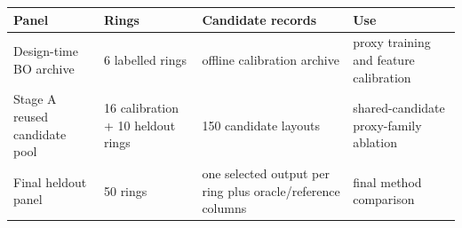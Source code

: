 \begin{tabular}{p{}p{}p{}p{}}
\toprule
Panel & Rings & Candidate records & Use \\
\midrule
Design-time BO archive & 6 labelled rings & offline calibration archive & proxy training and feature calibration \\
Stage A reused candidate pool & 16 calibration + 10 heldout rings & 150 candidate layouts & shared-candidate proxy-family ablation \\
Final heldout panel & 50 rings & one selected output per ring plus oracle/reference columns & final method comparison \\
\bottomrule
\end{tabular}
